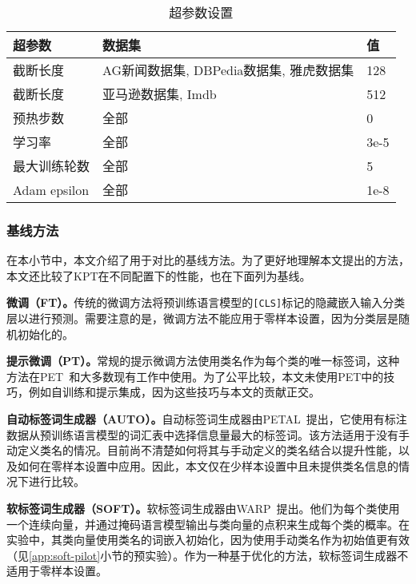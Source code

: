 \begin{table}[!htbp]
    \centering
    \begin{tabular}{p{}p{}p{}}
\toprule
      超参数  & 数据集 & 值 \\
\midrule
   截断长度  & AG新闻数据集, DBPedia数据集, 雅虎数据集    &  128 \\
截断长度  & 亚马逊数据集, Imdb    &  512 \\
   预热步数 & 全部 & 0 \\
   学习率 & 全部 & 3e-5 \\
   最大训练轮数 & 全部 & 5\\
   Adam epsilon & 全部 & 1e-8 \\
\bottomrule
    \end{tabular}
    \caption{超参数设置}
    \label{tab:app_exp_settings}
\end{table}




\subsubsection{基线方法}
在本小节中，本文介绍了用于对比的基线方法。为了更好地理解本文提出的方法，本文还比较了KPT在不同配置下的性能，也在下面列为基线。

\textbf{微调（FT）。}\quad 传统的微调方法将预训练语言模型的\texttt{[CLS]}标记的隐藏嵌入输入分类层以进行预测。需要注意的是，微调方法不能应用于零样本设置，因为分类层是随机初始化的。

\textbf{提示微调（PT）。}\quad 常规的提示微调方法使用类名作为每个类的唯一标签词，这种方法在PET~\cite{schick2020exploiting}和大多数现有工作中使用。为了公平比较，本文未使用PET中的技巧，例如自训练和提示集成，因为这些技巧与本文的贡献正交。

\textbf{自动标签词生成器（AUTO）。}\quad 自动标签词生成器由PETAL~\cite{schick2020automatically}提出，它使用有标注数据从预训练语言模型的词汇表中选择信息量最大的标签词。该方法适用于没有手动定义类名的情况。目前尚不清楚如何将其与手动定义的类名结合以提升性能，以及如何在零样本设置中应用。因此，本文仅在少样本设置中且未提供类名信息的情况下进行比较。

\textbf{软标签词生成器（SOFT）。}\quad 软标签词生成器由WARP~\cite{hambardzumyan-etal-2021-warp}提出。他们为每个类使用一个连续向量，并通过掩码语言模型输出与类向量的点积来生成每个类的概率。在实验中，其类向量使用类名的词嵌入初始化，因为使用手动类名作为初始值更有效（见\ref{app:soft-pilot}小节的预实验）。作为一种基于优化的方法，软标签词生成器不适用于零样本设置。

